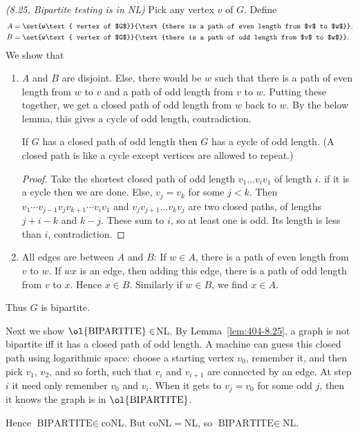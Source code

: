 \begin{problem}{\it(8.25, Bipartite testing is in NL)}
Pick any vertex $v$ of $G$. 
%
Define
\begin{align*}
A&=\set{w\text{ vertex of $G$}}{\text{there is a path of even length from $v$ to $w$}},\\
B&=\set{w\text{ vertex of $G$}}{\text{there is a path of odd length from $v$ to $w$}}.
\end{align*}
We show that
\begin{enumerate}
\item
$A$ and $B$ are disjoint. Else, there would be $w$ such that there is a path of even length from $w$ to $v$ and a path of odd length from $v$ to $w$. Putting these together, we get a closed path of odd length from $w$ back to $w$. By the below lemma, this gives a cycle of odd length, contradiction.
\begin{lem}
If $G$ has a closed path of odd length then $G$ has a cycle of odd length. (A closed path is like a cycle except vertices are allowed to repeat.)
\end{lem}
\begin{proof}
Take the shortest closed path of odd length 
$v_1\ldots v_iv_1$ of length $i$. if it is a cycle then we are done. Else, $v_j=v_k$ for some $j<k$. Then $v_1\cdots v_{j-1}v_jv_{k+1}\cdots v_iv_1$ and $v_jv_{j+1}\ldots v_kv_j$ are two closed paths, of lengths $j+i-k$ and $k-j$. These sum to $i$, so at least one is odd. Its length is less than $i$, contradiction. %
\end{proof}
\item
All edges are between $A$ and $B$: If $w\in A$, there is a path of even length from $v$ to $w$. If $wx$ is an edge, then adding this edge, there is a path of odd length from $v$ to $x$. Hence $x\in B$. Similarly if $w\in B$, we find $x\in A$.
\end{enumerate}
Thus $G$ is bipartite.

Next we show $\ol{\text{BIPARTITE}}\in$NL. By Lemma~\ref{lem:404-8.25}, a graph is not bipartite iff it has a closed path of odd length. A machine can guess this closed path using logarithmic space: choose a starting vertex $v_0$, remember it, and then pick $v_1$, $v_2$, and so forth, such that $v_i$ and $v_{i+1}$ are connected by an edge. At step $i$ it need only remember $v_0$ and $v_i$. When it gets to $v_j=v_0$ for some odd $j$, then it knows the graph is in $\ol{\text{BIPARTITE}}$.

Hence $\text{BIPARTITE}\in$coNL. But coNL$=$NL, so $\text{BIPARTITE}\in$NL.
\end{problem}

